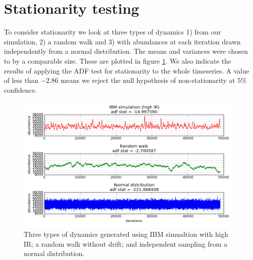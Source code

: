 \newpage
\section{Stationarity testing}

To consider stationarity we look at three types of dynamics 1) from our simulation, 2) a random walk and 3) with abundances at each iteration drawn independently from a normal distribution. The means and variances were chosen to by a comparable size. These are plotted in figure \ref{fig:adf}. We also indicate the results of applying the ADF test for stationarity to the whole timeseries. A value of less than $-2.86$ means we reject the null hypothesis of non-stationarity at $5\%$ confidence.

\begin{figure}[hb]
	\centering
	\includegraphics[width=0.8\linewidth]{"./chapters/chapter04/figures/steadystate/hi_rw_ns_dynamics"}
     \caption{Three types of dynamics generated using IBM simualtion with high IR; a random walk without drift; and independent sampling from a normal distribution.} 
     \label{fig:adf}   
\end{figure}


